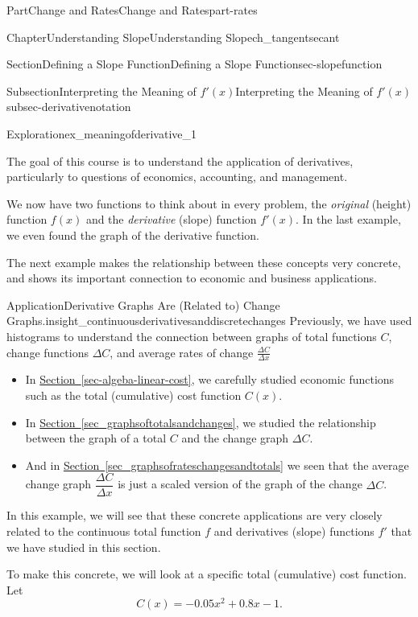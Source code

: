 \documentclass{tufte-book}
\newcommand{\xreffont}{\relax}
\numberwithin{equation}{chapter}
\begin{document}
\begin{partptx}{Part}{Change and Rates}{}{Change and Rates}{}{}{part-rates}
\begin{chapterptx}{Chapter}{Understanding Slope}{}{Understanding Slope}{}{}{ch_tangentsecant}
\begin{sectionptx}{Section}{Defining a Slope Function}{}{Defining a Slope Function}{}{}{sec-slopefunction}
\begin{subsectionptx}{Subsection}{Interpreting the Meaning of \(f'(x)\)}{}{Interpreting the Meaning of \(f'(x)\)}{}{}{subsec-derivativenotation}
\begin{exploration}{Exploration}{}{ex_meaningofderivative_1}
\begin{enumerate}[font=\bfseries,label=(\alph*),ref=\alph*]
\end{enumerate}%
\end{exploration}%
\end{subsectionptx}
The goal of this course is to understand the application of derivatives, particularly to questions of economics, accounting, and management.%
\par
We now have two functions to think about in every problem, the \emph{original} (height) function \(f(x)\) and the \emph{derivative} (slope) function \(f'(x)\). In the last example, we even found the graph of the derivative function.%
\par
The next example makes the relationship between these concepts very concrete, and shows its important connection to economic and business applications.%
\begin{insight}{Application}{Derivative Graphs Are (Related to) Change Graphs.}{insight_continuousderivativesanddiscretechanges}%
Previously, we have used histograms to understand the connection between graphs of total functions \(C\), change functions \(\Delta C\), and average rates of change \(\frac{\Delta C}{\Delta x}\)%
\begin{itemize}[label=\textbullet]
\item{}In \hyperref[sec-algeba-linear-cost]{Section~{\xreffont\ref{sec-algeba-linear-cost}}}, we carefully studied economic functions such as the total (cumulative) cost function  \(C(x)\).%
\item{}In \hyperref[sec_graphsoftotalsandchanges]{Section~{\xreffont\ref{sec_graphsoftotalsandchanges}}}, we studied the relationship between the graph of a total \(C\) and the change graph \(\Delta C\).%
\item{}And in \hyperref[sec_graphsofrateschangesandtotals]{Section~{\xreffont\ref{sec_graphsofrateschangesandtotals}}} we seen that the average change graph \(\dfrac{\Delta C}{\Delta x}\) is just  a scaled version of the graph of the change \(\Delta C\).%
\end{itemize}
%
\par
In this example, we will see that these  concrete applications are very closely related to the continuous total function \(f\) and  derivatives (slope) functions \(f'\) that we have studied in this section.%
\par
To make this concrete, we will look at a specific total (cumulative) cost function.  Let%
\begin{equation*}
C(x) = -0.05 x^2 + 0.8 x - 1\text{.}
\end{equation*}

\end{insight}
\end{sectionptx}
\end{chapterptx}
\end{partptx}
\end{document}
